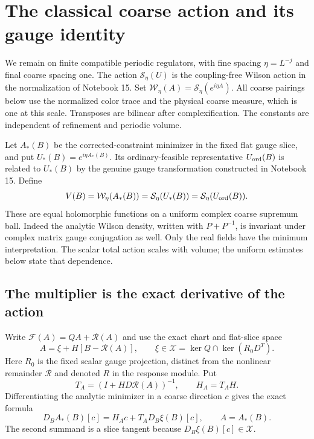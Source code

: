 \documentclass[11pt]{article}
\theoremstyle{remark}
\newcommand{\norm}[1]{\left\|#1\right\|}
\begin{document}

\section{The classical coarse action and its gauge identity}
\label{ca-section}

We remain on finite compatible periodic regulators, with fine
spacing $\eta=L^{-j}$ and final coarse spacing one. The action
$\mathcal S_\eta(U)$ is the coupling-free Wilson action in the
normalization of Notebook 15. Set
$\mathcal W_\eta(A)=\mathcal S_\eta(e^{i\eta A})$.
All coarse pairings below use the normalized color trace and
the physical coarse measure, which is one at this scale.
Transposes are bilinear after complexification. The constants
are independent of refinement and periodic volume.

Let $A_*(B)$ be the corrected-constraint minimizer in the fixed
flat gauge slice, and put $U_*(B)=e^{i\eta A_*(B)}$. Its
ordinary-feasible representative $U_{\rm ord}(B)$ is related
to $U_*(B)$ by the genuine gauge transformation constructed in
Notebook 15. Define
\begin{equation}\label{ca-definition}
 V(B)=\mathcal W_\eta(A_*(B))
     =\mathcal S_\eta(U_*(B))
     =\mathcal S_\eta(U_{\rm ord}(B)).
\end{equation}
These are equal holomorphic functions on a uniform complex
coarse supremum ball. Indeed the analytic Wilson density,
written with $P+P^{-1}$, is invariant under complex matrix
gauge conjugation as well. Only the real fields have the
minimum interpretation. The scalar total action scales with
volume; the uniform estimates below state that dependence.

\subsection{The multiplier is the exact derivative of the action}
\label{ca-envelope-section}

Write $\mathcal F(A)=QA+\mathcal R(A)$ and use the exact
chart and flat-slice space
\[
 A=\xi+H[B-\mathcal R(A)],\qquad
 \xi\in\mathcal X=\ker Q\cap\ker(R_0D^T).
\]
Here $R_0$ is the fixed scalar gauge projection, distinct from
the nonlinear remainder $\mathcal R$ and denoted $R$ in the
response module. Put
\begin{equation}\label{ca-chart-differential}
 T_A=(I+HD\mathcal R(A))^{-1},\qquad H_A=T_AH.
\end{equation}
Differentiating the analytic minimizer in a coarse direction $c$
gives the exact formula
\begin{equation}\label{ca-response-decomposition}
 D_BA_*(B)[c]=H_Ac+T_AD_B\xi(B)[c],\qquad A=A_*(B).
\end{equation}
The second summand is a slice tangent because
$D_B\xi(B)[c]\in\mathcal X$.
\end{document}
